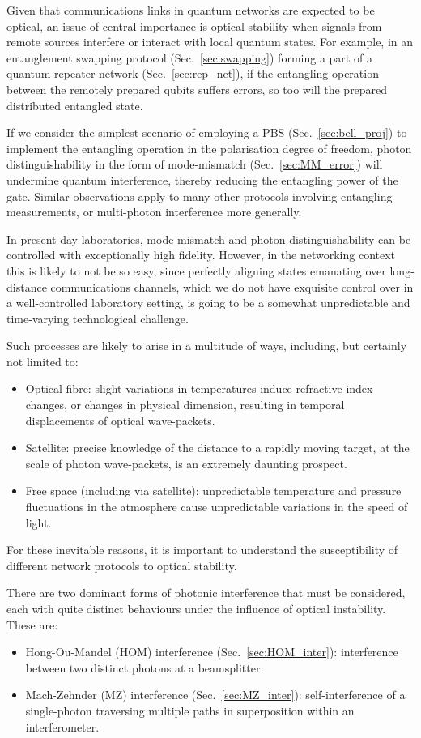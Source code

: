 \documentclass[aps, rmp, twocolumn, amsmath, amssymb, nofootinbib, superscriptaddress, longbibliography, floatfix, table-of-contents, eqsecnum]{revtex4-1}
\begin{document}
Given that communications links in quantum networks are expected to be optical, an issue of central importance is optical stability when signals from remote sources interfere or interact with local quantum states. For example, in an entanglement swapping protocol (Sec.~\ref{sec:swapping}) forming a part of a quantum repeater network (Sec.~\ref{sec:rep_net}), if the entangling operation between the remotely prepared qubits suffers errors, so too will the prepared distributed entangled state.

If we consider the simplest scenario of employing a PBS (Sec.~\ref{sec:bell_proj}) to implement the entangling operation in the polarisation degree of freedom, photon distinguishability in the form of mode-mismatch (Sec.~\ref{sec:MM_error}) will undermine quantum interference, thereby reducing the entangling power of the gate. Similar observations apply to many other protocols involving entangling measurements, or multi-photon interference more generally.

In present-day laboratories, mode-mismatch and photon-distinguishability can be controlled with exceptionally high fidelity. However, in the networking context this is likely to not be so easy, since perfectly aligning states emanating over long-distance communications channels, which we do not have exquisite control over in a well-controlled laboratory setting, is going to be a somewhat unpredictable and time-varying technological challenge.

Such processes are likely to arise in a multitude of ways, including, but certainly not limited to:
\begin{itemize}
	\item Optical fibre: slight variations in temperatures induce refractive index changes, or changes in physical dimension, resulting in temporal displacements of optical wave-packets.
	\item Satellite: precise knowledge of the distance to a rapidly moving target, at the scale of photon wave-packets, is an extremely daunting prospect.
	\item Free space (including via satellite): unpredictable temperature and pressure fluctuations in the atmosphere cause unpredictable variations in the speed of light.
\end{itemize}

For these inevitable reasons, it is important to understand the susceptibility of different network protocols to optical stability. 

There are two dominant forms of photonic interference that must be considered, each with quite distinct behaviours under the influence of optical instability. These are:
\begin{itemize}	
	\item Hong-Ou-Mandel (HOM) interference (Sec.~\ref{sec:HOM_inter}):  interference between two distinct photons at a beamsplitter.
	\item Mach-Zehnder (MZ) interference (Sec.~\ref{sec:MZ_inter}): self-interference of a single-photon traversing multiple paths in superposition within an interferometer.
\end{itemize}
\end{document}
